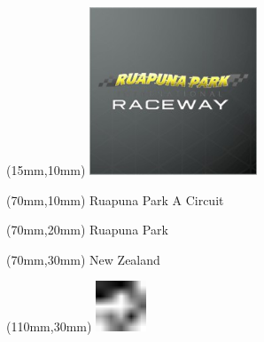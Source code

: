 \null\newpage
\begin{textblock*}{50mm}(15mm,10mm)%
\includegraphics[width=50mm]{LG/RUPU.png}
\end{textblock*}
\begin{textblock*}{130mm}(70mm,10mm)%
{\fontsize{20}{20}\selectfont Ruapuna Park A Circuit}\\
\end{textblock*}
\begin{textblock*}{120mm}(70mm,20mm)%
{\fontsize{16}{16}\selectfont Ruapuna Park}\\
\end{textblock*}
\begin{textblock*}{120mm}(70mm,30mm)%
{\fontsize{12}{12}\selectfont New Zealand}
\end{textblock*}
\begin{textblock*}{30mm}(110mm,30mm)%
\centering
\includegraphics[height=15mm]{icons/fa-rotate-left.pdf}
\end{textblock*}
